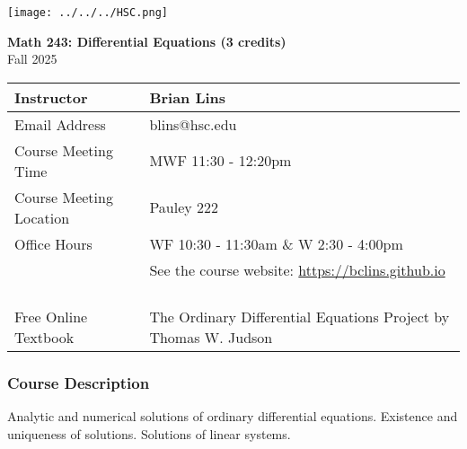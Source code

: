 \documentclass[10pt]{article}
\begin{document}
\noindent
%


\begin{center}
\texttt{[image: ../../../HSC.png]} 
\bigskip

\textbf{Math 243: Differential Equations (3 credits)} \\
Fall 2025
\end{center}

\noindent
\begin{tabular}{|l|l|}
\hline
Instructor & Brian Lins \\ \hline
Email Address & blins@hsc.edu \\ \hline
Course Meeting Time & MWF 11:30 - 12:20pm  \\ \hline
Course Meeting Location & Pauley 222  \\ \hline
Office Hours & WF 10:30 - 11:30am \& W 2:30 - 4:00pm \\ 
& See the course website: \url{https://bclins.github.io} ~ \\ \hline
Free Online Textbook & The Ordinary Differential Equations Project by Thomas W. Judson \\ \hline
\end{tabular}

\subsubsection*{Course Description}

Analytic and numerical solutions of ordinary differential equations. Existence and uniqueness of solutions. Solutions of linear systems.
\end{document}
